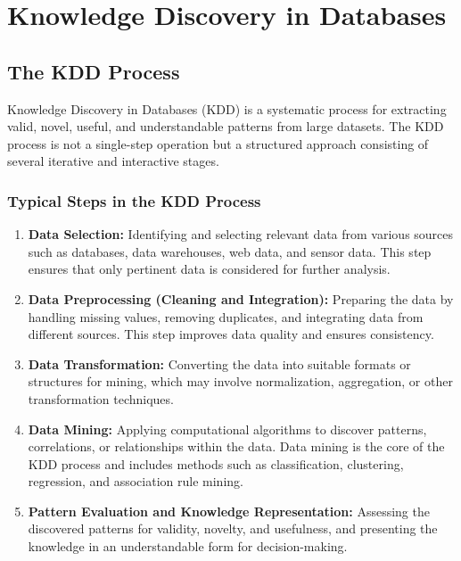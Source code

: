 %
%
%





\chapter{Knowledge Discovery in Databases}

\section{The KDD Process}

Knowledge Discovery in Databases (KDD) is a systematic process for extracting valid, novel, useful, and understandable patterns from large datasets. The KDD process is not a single-step operation but a structured approach consisting of several iterative and interactive stages. \cite{Maimon:2005}

\subsection{Typical Steps in the KDD Process}

\begin{enumerate}[label=\textbf{\arabic*.}, leftmargin=2.5em]
	
	\item \textbf{Data Selection:} Identifying and selecting relevant data from various sources such as databases, data warehouses, web data, and sensor data. This step ensures that only pertinent data is considered for further analysis. \cite{Maimon:2005}
	
	\item \textbf{Data Preprocessing (Cleaning and Integration):} Preparing the data by handling missing values, removing duplicates, and integrating data from different sources. This step improves data quality and ensures consistency. \cite{Maimon:2005}
	
	\item \textbf{Data Transformation:} Converting the data into suitable formats or structures for mining, which may involve normalization, aggregation, or other transformation techniques. \cite{Maimon:2005}
	
	\item \textbf{Data Mining:} Applying computational algorithms to discover patterns, correlations, or relationships within the data. Data mining is the core of the KDD process and includes methods such as classification, clustering, regression, and association rule mining. \cite{Maimon:2005}
	
	\item \textbf{Pattern Evaluation and Knowledge Representation:} Assessing the discovered patterns for validity, novelty, and usefulness, and presenting the knowledge in an understandable form for decision-making. \cite{Maimon:2005}
	
\end{enumerate}

